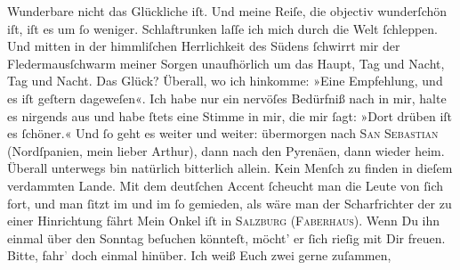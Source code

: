 \begin{ledgroupsized}[t]{13cm}
               Wunderbare nicht das Glückliche iſt. Und meine Reiſe, die objectiv wunderſchön iſt,
               iſt es \label{T_L02701-12v}\label{T_L02701-12h} um ſo weniger. Schlaftrunken laſſe ich mich durch die Welt
               ſchleppen. Und mitten in\strikeout{\textcolor{gray}{s}} der himmliſchen Herrlichkeit des Südens ſchwirrt mir der Fledermausſchwarm
               meiner Sorgen unaufhörlich um das Haupt, Tag und Nacht, Tag und Nacht. Das Glück?
               Überall, wo ich hinkomme: »Eine Empfehlung, {\pb}und es
               iſt geſtern dageweſen«. Ich habe nur ein nervöſes Bedürfniß nach \label{K_L02701-2v}\label{K_L02701-2h} in mir, halte es
               nirgends aus und habe ſtets eine Stimme in mir, die mir ſagt: »Dort drüben iſt es
               ſchöner.« Und ſo geht es weiter und weiter: übermorgen
               nach \textsc{San Sebastian} (Nordſpanien, mein lieber Arthur), dann
               nach den Pyrenäen, dann wieder heim. Überall
               unterwegs bin natürlich {\pb}bitterlich allein. Kein
               Menſch zu finden in dieſem verdammten Lande. Mit dem deutſchen Accent ſcheucht man
               die Leute von ſich fort,  und man ſitzt im \label{K_L02701-3v}\label{K_L02701-3h} und im \label{T_L02701-3v}\label{T_L02701-3h} ſo
               gemieden, als wäre man der Scharfrichter der zu einer Hinrichtung fährt{\dotsfour}\pend
           \pstart
           Mein Onkel iſt in \textsc{Salzburg} (\textsc{Faberhaus}). {\pb}Wenn Du ihn einmal über den Sonntag
               beſuchen könnteſt, möcht’ er ſich rieſig mit Dir freuen. Bitte,
                  fahr\textcolor{gray}{’} doch einmal hinüber. Ich weiß Euch zwei gerne zuſammen,

\end{ledgroupsized}
